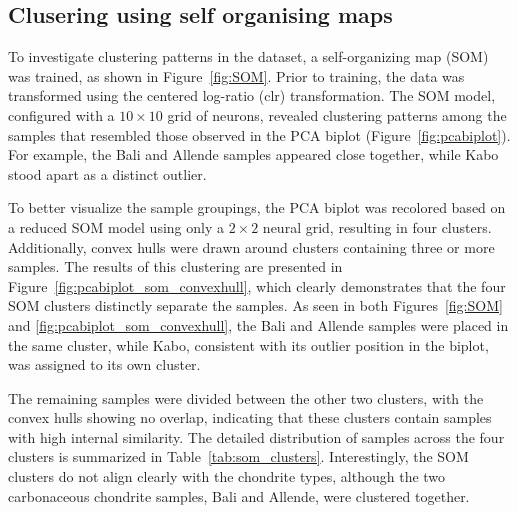 





\subsection{Clusering using self organising maps}

To investigate clustering patterns in the dataset, a self-organizing map (SOM) was trained, as shown in Figure~\ref{fig:SOM}. Prior to training, the data was transformed using the centered log-ratio (clr) transformation. The SOM model, configured with a $10 \times 10$ grid of neurons, revealed clustering patterns among the samples that resembled those observed in the PCA biplot (Figure~\ref{fig:pcabiplot}). For example, the Bali and Allende samples appeared close together, while Kabo stood apart as a distinct outlier.



To better visualize the sample groupings, the PCA biplot was recolored based on a reduced SOM model using only a $2 \times 2$ neural grid, resulting in four clusters. Additionally, convex hulls were drawn around clusters containing three or more samples. The results of this clustering are presented in Figure~\ref{fig:pcabiplot_som_convexhull}, which clearly demonstrates that the four SOM clusters distinctly separate the samples. As seen in both Figures~\ref{fig:SOM} and \ref{fig:pcabiplot_som_convexhull}, the Bali and Allende samples were placed in the same cluster, while Kabo, consistent with its outlier position in the biplot, was assigned to its own cluster.



The remaining samples were divided between the other two clusters, with the convex hulls showing no overlap, indicating that these clusters contain samples with high internal similarity. The detailed distribution of samples across the four clusters is summarized in Table~\ref{tab:som_clusters}. Interestingly, the SOM clusters do not align clearly with the chondrite types, although the two carbonaceous chondrite samples, Bali and Allende, were clustered together.

